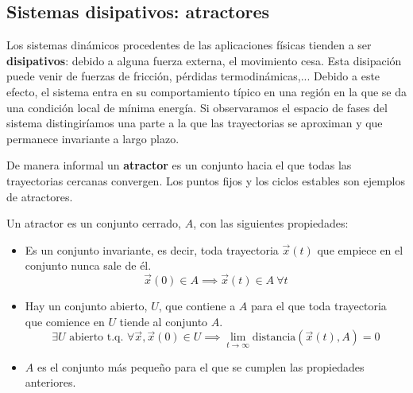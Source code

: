 \subsection{Sistemas disipativos: atractores}
Los sistemas dinámicos procedentes de las aplicaciones físicas tienden a ser \textbf{disipativos}: debido a alguna fuerza externa, el movimiento cesa. Esta disipación puede venir de fuerzas de fricción, pérdidas termodinámicas,... Debido a este efecto, el sistema entra en su comportamiento típico en una región en la que se da una condición local de mínima energía. Si observaramos el espacio de fases del sistema distingiríamos una parte a la que las trayectorias se aproximan y que permanece invariante a largo plazo.

De manera informal un \textbf{atractor} es un conjunto hacia el que todas las trayectorias cercanas convergen. Los puntos fijos y los ciclos estables son ejemplos de atractores.

\begin{definition}[Atractor]
Un atractor es un conjunto cerrado, $A$, con las siguientes propiedades:
\begin{itemize}
\item Es un conjunto invariante, es decir, toda trayectoria $\vec{x}(t)$ que empiece en el conjunto nunca sale de él.
\[\vec{x}(0) \in A \implies \vec{x}(t) \in A \ \forall t\]
\item Hay un conjunto abierto, $U$, que contiene a $A$ para el que toda trayectoria que comience en $U$ tiende al conjunto $A$.
\[\exists U \text{ abierto t.q. } \forall \vec{x}, \vec{x}(0) \in U \implies \lim_{t\to \infty}\text{distancia}(\vec{x}(t),A) = 0\]
\item $A$ es el conjunto más pequeño para el que se cumplen las propiedades anteriores.
\end{itemize}
\end{definition}

